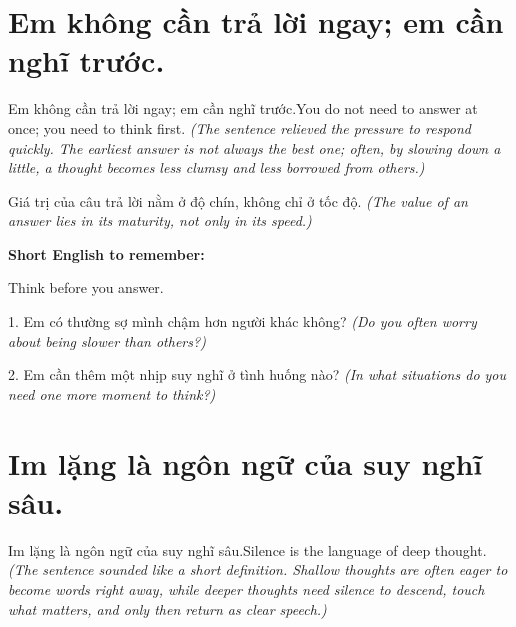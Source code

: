 \section{Em không cần trả lời ngay; em cần nghĩ trước.}
\begin{truyen}{Em không cần trả lời ngay; em cần nghĩ trước.}{You do not need to answer at once; you need to think first.}
\textit{(The sentence relieved the pressure to respond quickly. The earliest answer is not always the best one; often, by slowing down a little, a thought becomes less clumsy and less borrowed from others.)}
\end{truyen}

\begin{baihoc}
Giá trị của câu trả lời nằm ở độ chín, không chỉ ở tốc độ.
\textit{(The value of an answer lies in its maturity, not only in its speed.)}
\end{baihoc}

\begin{ghinhoanh}
\textbf{Short English to remember:}

Think before you answer.

\end{ghinhoanh}

\begin{tuhocnhanh}
1. Em có thường sợ mình chậm hơn người khác không? \textit{(Do you often worry about being slower than others?)}

2. Em cần thêm một nhịp suy nghĩ ở tình huống nào? \textit{(In what situations do you need one more moment to think?)}
\end{tuhocnhanh}
\ngancach


\section{Im lặng là ngôn ngữ của suy nghĩ sâu.}
\begin{truyen}{Im lặng là ngôn ngữ của suy nghĩ sâu.}{Silence is the language of deep thought.}
\textit{(The sentence sounded like a short definition. Shallow thoughts are often eager to become words right away, while deeper thoughts need silence to descend, touch what matters, and only then return as clear speech.)}
\end{truyen}

